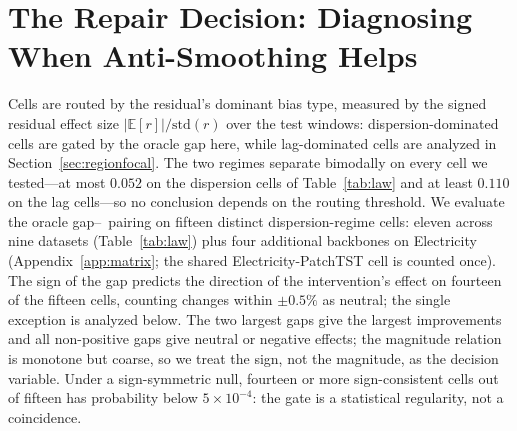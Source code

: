 \section{The Repair Decision: Diagnosing When Anti-Smoothing Helps}
\label{sec:law}

Cells are routed by the residual's dominant bias type, measured by the signed residual effect size $|\mathbb{E}[r]|/\mathrm{std}(r)$ over the test windows: dispersion-dominated cells are gated by the oracle gap here, while lag-dominated cells are analyzed in Section~\ref{sec:regionfocal}. The two regimes separate bimodally on every cell we tested---at most $0.052$ on the dispersion cells of Table~\ref{tab:law} and at least $0.110$ on the lag cells---so no conclusion depends on the routing threshold. We evaluate the oracle gap--\rfc~pairing on fifteen distinct dispersion-regime cells: eleven across nine datasets (Table~\ref{tab:law}) plus four additional backbones on Electricity (Appendix~\ref{app:matrix}; the shared Electricity-PatchTST cell is counted once). The sign of the gap predicts the direction of the intervention's effect on fourteen of the fifteen cells, counting changes within $\pm 0.5\%$ as neutral; the single exception is analyzed below. The two largest gaps give the largest improvements and all non-positive gaps give neutral or negative effects; the magnitude relation is monotone but coarse, so we treat the sign, not the magnitude, as the decision variable. Under a sign-symmetric null, fourteen or more sign-consistent cells out of fifteen has probability below $5 \times 10^{-4}$: the gate is a statistical regularity, not a coincidence.

